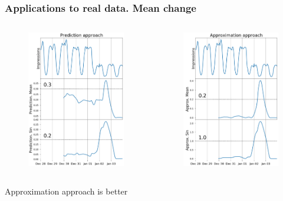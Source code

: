 \documentclass[intlimits, 9pt, unicode]{beamer}
\begin{document}
\begin{frame}
    \frametitle{Applications to real data. Mean change}
  \begin{columns}[T,onlytextwidth]
	\begin{figure}
	\includegraphics[height=6cm]{images/methods_comparison_1_1}
	\end{figure}
	
	\begin{figure}
	\includegraphics[height=6cm]{images/methods_comparison_1_2}
	\end{figure}
	
     \end{columns}
 
 \medskip    
     \hfill Approximation approach is better

\end{frame}
\end{document}
